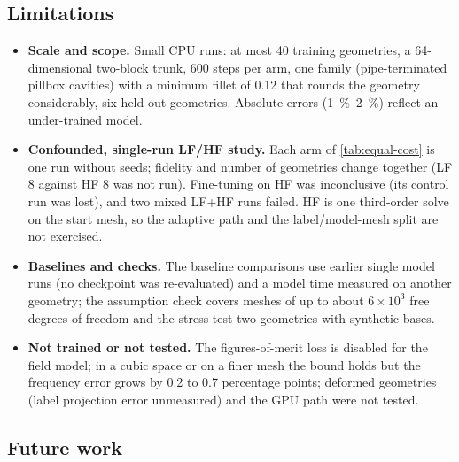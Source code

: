 \subsection{Limitations}\label{sec:08-limitations}

\begin{itemize}
\item \textbf{Scale and scope.} Small CPU runs: at most 40 training geometries, a 64-dimensional two-block trunk, 600 steps per arm, one family (pipe-terminated pillbox cavities) with a minimum fillet of 0.12 that rounds the geometry considerably, six held-out geometries. Absolute errors (\SIrange{1}{2}{\percent}) reflect an under-trained model. %
\item \textbf{Confounded, single-run LF/HF study.} Each arm of \cref{tab:equal-cost} is one run without seeds; fidelity and number of geometries change together (LF 8 against HF 8 was not run). Fine-tuning on HF was inconclusive (its control run was lost), and two mixed LF+HF runs failed. HF is one third-order solve on the start mesh, so the adaptive path and the label/model-mesh split are not exercised. %
\item \textbf{Baselines and checks.} The baseline comparisons use earlier single model runs (no checkpoint was re-evaluated) and a model time measured on another geometry; the assumption check covers meshes of up to about $6\times10^3$ free degrees of freedom and the stress test two geometries with synthetic bases. %
\item \textbf{Not trained or not tested.} The figures-of-merit loss is disabled for the field model; in a cubic space or on a finer mesh the bound holds but the frequency error grows by 0.2 to 0.7 percentage points; deformed geometries (label projection error unmeasured) and the GPU path were not tested. %
\end{itemize}

\subsection{Future work}\label{sec:08-future}

